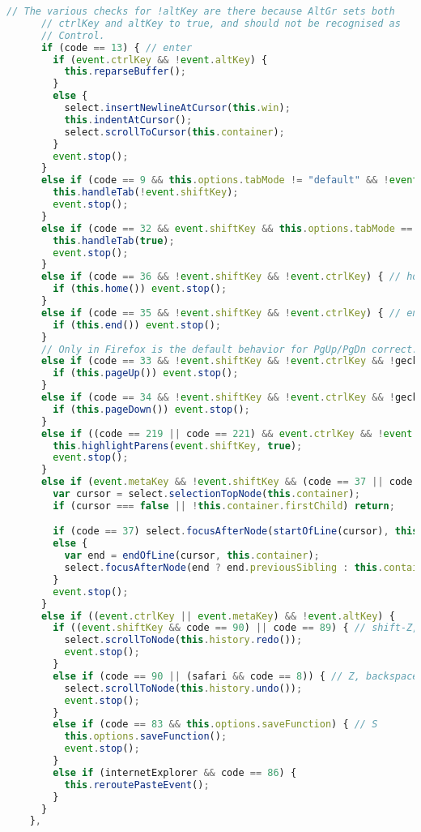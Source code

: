 \begin{lstlisting}[language=Javascript]
      // The various checks for !altKey are there because AltGr sets both
      // ctrlKey and altKey to true, and should not be recognised as
      // Control.
      if (code == 13) { // enter
        if (event.ctrlKey && !event.altKey) {
          this.reparseBuffer();
        }
        else {
          select.insertNewlineAtCursor(this.win);
          this.indentAtCursor();
          select.scrollToCursor(this.container);
        }
        event.stop();
      }
      else if (code == 9 && this.options.tabMode != "default" && !event.ctrlKey) { // tab
        this.handleTab(!event.shiftKey);
        event.stop();
      }
      else if (code == 32 && event.shiftKey && this.options.tabMode == "default") { // space
        this.handleTab(true);
        event.stop();
      }
      else if (code == 36 && !event.shiftKey && !event.ctrlKey) { // home
        if (this.home()) event.stop();
      }
      else if (code == 35 && !event.shiftKey && !event.ctrlKey) { // end
        if (this.end()) event.stop();
      }
      // Only in Firefox is the default behavior for PgUp/PgDn correct.
      else if (code == 33 && !event.shiftKey && !event.ctrlKey && !gecko) { // PgUp
        if (this.pageUp()) event.stop();
      }
      else if (code == 34 && !event.shiftKey && !event.ctrlKey && !gecko) {  // PgDn
        if (this.pageDown()) event.stop();
      }
      else if ((code == 219 || code == 221) && event.ctrlKey && !event.altKey) { // [, ]
        this.highlightParens(event.shiftKey, true);
        event.stop();
      }
      else if (event.metaKey && !event.shiftKey && (code == 37 || code == 39)) { // Meta-left/right
        var cursor = select.selectionTopNode(this.container);
        if (cursor === false || !this.container.firstChild) return;

        if (code == 37) select.focusAfterNode(startOfLine(cursor), this.container);
        else {
          var end = endOfLine(cursor, this.container);
          select.focusAfterNode(end ? end.previousSibling : this.container.lastChild, this.container);
        }
        event.stop();
      }
      else if ((event.ctrlKey || event.metaKey) && !event.altKey) {
        if ((event.shiftKey && code == 90) || code == 89) { // shift-Z, Y
          select.scrollToNode(this.history.redo());
          event.stop();
        }
        else if (code == 90 || (safari && code == 8)) { // Z, backspace
          select.scrollToNode(this.history.undo());
          event.stop();
        }
        else if (code == 83 && this.options.saveFunction) { // S
          this.options.saveFunction();
          event.stop();
        }
        else if (internetExplorer && code == 86) {
          this.reroutePasteEvent();
        }
      }
    },


\end{lstlisting}
